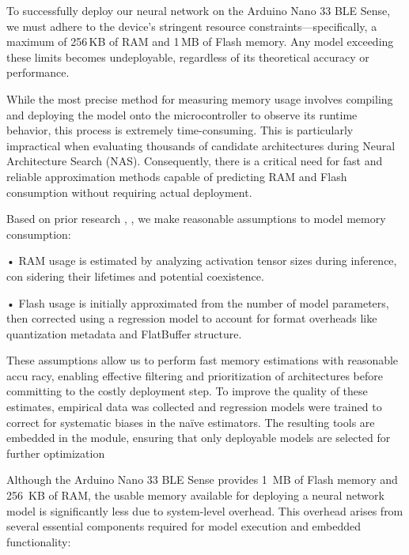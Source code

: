 To successfully deploy our neural network on the Arduino Nano 33 BLE Sense, we must adhere to the device's stringent resource constraints—specifically, a maximum of 256\,KB of RAM and 1\,MB of Flash memory. Any model exceeding these limits becomes undeployable, regardless of its theoretical accuracy or performance.

While the most precise method for measuring memory usage involves compiling and deploying the model onto the microcontroller to observe its runtime behavior, this process is extremely time-consuming. This is particularly impractical when evaluating thousands of candidate architectures during Neural Architecture Search (NAS). Consequently, there is a critical need for fast and reliable approximation methods capable of predicting RAM and Flash consumption without requiring actual deployment.


Based on prior research \cite{tensorflow_RamEstimation}, \cite{liberis2019neural} , we make reasonable assumptions to model
memory consumption:

• RAM usage is estimated by analyzing activation tensor sizes during inference, con
sidering their lifetimes and potential coexistence.

• Flash usage is initially approximated from the number of model parameters, then
corrected using a regression model to account for format overheads like quantization
metadata and FlatBuffer structure.

These assumptions allow us to perform fast memory estimations with reasonable accu
racy, enabling effective filtering and prioritization of architectures before committing to
the costly deployment step. To improve the quality of these estimates, empirical data
was collected and regression models were trained to correct for systematic biases in the
naïve estimators. The resulting tools are embedded in the module, ensuring that only
deployable models are selected for further optimization

Although the Arduino Nano 33 BLE Sense provides 1~MB of Flash memory and 256~KB of RAM, the usable memory available for deploying a neural network model is significantly less due to system-level overhead. This overhead arises from several essential components required for model execution and embedded functionality:

